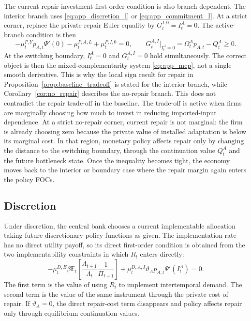 ﻿\documentclass[12pt]{article}
\theoremstyle{remark}
\newcommand{\E}{\mathbb E}
\begin{document}
The current repair-investment first-order condition is also branch dependent. The interior branch
uses \eqref{eq:app_discretion_I} or \eqref{eq:app_commitment_I}. At a strict corner, replace the
private repair Euler equality by $G_t^{I,0}=I_t^A=0$. The active-branch condition is then
\begin{equation}
    -\mu_t^{P,Y}p_{A,t}\Psi'(0)
    -
    \mu_t^{P,A,L}
    +
    \mu_t^{P,I,0}
    =
    0,
    \qquad
    G_t^{A,I}\big|_{I_t^A=0}
    =
    \Omega_t^Ap_{A,t}-Q_t^A
    \ge0.
    \label{eq:app_corner_I_condition}
\end{equation}
At the switching boundary, $I_t^A=0$ and $G_t^{A,I}=0$ hold simultaneously. The correct object is
then the mixed-complementarity system \eqref{eq:app_mcp}, not a single smooth derivative. This is why
the local sign result for repair in Proposition~\ref{prop:baseline_tradeoff} is stated for the
interior branch, while Corollary~\ref{cor:no_repair} describes the no-repair branch.
This does not contradict the repair trade-off in the baseline. The trade-off is active when firms
are marginally choosing how much to invest in reducing imported-input dependence. At a strict
no-repair corner, current repair is not marginal: the firm is already choosing zero because the
private value of installed adaptation is below its marginal cost. In that region, monetary policy
affects repair only by changing the distance to the switching boundary, through the continuation
value $Q_t^A$ and the future bottleneck state. Once the inequality becomes tight, the economy moves
back to the interior or boundary case where the repair margin again enters the policy FOCs.

\subsection{Discretion}

Under discretion, the central bank chooses a current implementable allocation taking future
discretionary policy functions as given. The implementation rate has no direct utility payoff, so
its direct first-order condition is obtained from the two implementability constraints in which
$R_t$ enters directly:
\begin{equation}
    -\mu_t^{D,E}
    \beta
    \E_t
    \left[
        \frac{\Lambda_{t+1}}{\Lambda_t}
        \frac{1}{\Pi_{t+1}}
    \right]
    +
    \mu_t^{D,A,I}
    \vartheta_Ap_{A,t}\Psi'(I_t^A)
    =
    0.
    \label{eq:app_discretion_R}
\end{equation}
The first term is the value of using $R_t$ to implement intertemporal demand. The second term is
the value of the same instrument through the private cost of repair. If $\vartheta_A=0$, the direct
repair-cost term disappears and policy affects repair only through equilibrium continuation values.
\end{document}
